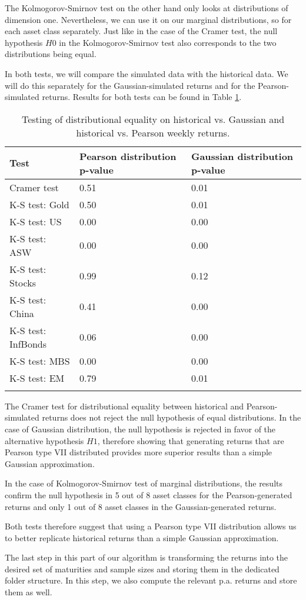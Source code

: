 The Kolmogorov-Smirnov test on the other hand only looks at distributions of dimension one. Nevertheless, we can use it on our marginal distributions, so for each asset class separately.
Just like in the case of the Cramer test, the null hypothesis $H0$ in the Kolmogorov-Smirnov test also corresponds to the two distributions being equal.

In both tests, we will compare the simulated data with the historical data. We will do this separately for the Gaussian-simulated returns and for the Pearson-simulated returns. Results for both tests can be found in Table \ref{tab:return_estimation:KS_Cramer_testing}.

\begin{table}[h]
	\centering
	\begin{tabularx}{0.9\linewidth}{lXX}
		Test & Pearson distribution p-value & Gaussian distribution p-value\\
		\toprule
		Cramer test & 0.51 & 0.01 \\
		\toprule
		K-S test: Gold & 0.50 & 0.01 \\
		K-S test: US & 0.00 & 0.00 \\
		K-S test: ASW & 0.00 & 0.00 \\
		K-S test: Stocks & 0.99 & 0.12 \\
		K-S test: China & 0.41 & 0.00 \\
		K-S test: InfBonds & 0.06 & 0.00 \\
		K-S test: MBS & 0.00 & 0.00 \\
		K-S test: EM & 0.79 & 0.01 \\
		\bottomrule& 
	\end{tabularx}
	\caption{Testing of distributional equality on historical vs. Gaussian and historical vs. Pearson weekly returns.}
	\label{tab:return_estimation:KS_Cramer_testing}
\end{table} 

The Cramer test for distributional equality between historical and Pearson-simulated returns does not reject the null hypothesis of equal distributions. In the case of Gaussian distribution, the null hypothesis is rejected in favor of the alternative hypothesis $H1$, therefore showing that generating returns that are Pearson type VII distributed provides more superior results than a simple Gaussian approximation.

In the case of Kolmogorov-Smirnov test of marginal distributions, the results confirm the null hypothesis in 5 out of 8 asset classes for the Pearson-generated returns and only 1 out of 8 asset classes in the Gaussian-generated returns.

Both tests therefore suggest that using a Pearson type VII distribution allows us to better replicate historical returns than a simple Gaussian approximation.

The last step in this part of our algorithm is transforming the returns into the desired set of maturities and sample sizes and storing them in the dedicated folder structure. In this step, we also compute the relevant p.a. returns and store them as well.





